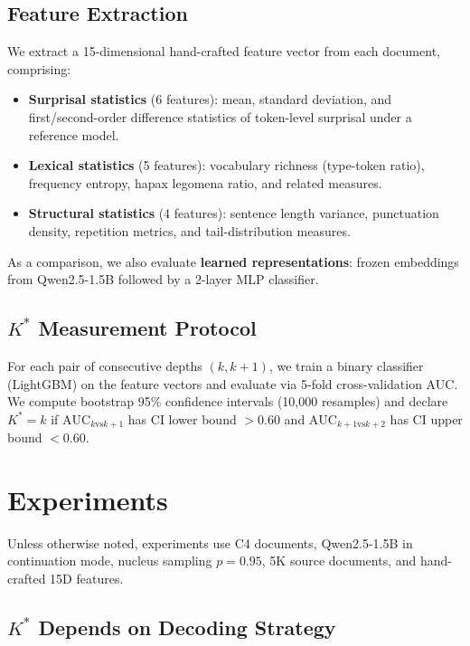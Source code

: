 \documentclass[11pt]{article}
\begin{document}
\subsection{Feature Extraction}

We extract a 15-dimensional hand-crafted feature vector from each document, comprising:
\begin{itemize}
    \item \textbf{Surprisal statistics} (6 features): mean, standard deviation, and first/second-order difference statistics of token-level surprisal under a reference model.
    \item \textbf{Lexical statistics} (5 features): vocabulary richness (type-token ratio), frequency entropy, hapax legomena ratio, and related measures.
    \item \textbf{Structural statistics} (4 features): sentence length variance, punctuation density, repetition metrics, and tail-distribution measures.
\end{itemize}

As a comparison, we also evaluate \textbf{learned representations}: frozen embeddings from Qwen2.5-1.5B followed by a 2-layer MLP classifier.

\subsection{$K^*$ Measurement Protocol}

For each pair of consecutive depths $(k, k{+}1)$, we train a binary classifier (LightGBM) on the feature vectors and evaluate via 5-fold cross-validation AUC. We compute bootstrap 95\% confidence intervals (10,000 resamples) and declare $K^* = k$ if $\text{AUC}_{k \text{vs} k{+}1}$ has CI lower bound $> 0.60$ and $\text{AUC}_{k{+}1 \text{vs} k{+}2}$ has CI upper bound $< 0.60$.

\section{Experiments}
\label{sec:experiments}

Unless otherwise noted, experiments use C4 documents, Qwen2.5-1.5B in continuation mode, nucleus sampling $p{=}0.95$, 5K source documents, and hand-crafted 15D features.

\subsection{$K^*$ Depends on Decoding Strategy}
\label{sec:decoding}
\end{document}
